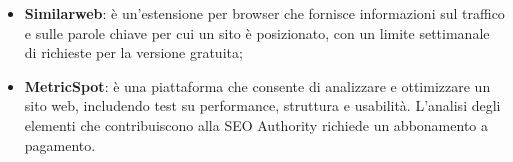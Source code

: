 \begin{itemize}
    \item \textbf{Similarweb}: è un’estensione per browser che fornisce informazioni sul traffico e sulle parole chiave per cui un sito è posizionato, con un limite settimanale di richieste per la versione gratuita;
    \item \textbf{MetricSpot}: è una piattaforma che consente di analizzare e ottimizzare un sito web, includendo test su performance, struttura e usabilità. L’analisi degli elementi che contribuiscono alla SEO Authority richiede un abbonamento a pagamento.
\end{itemize}
